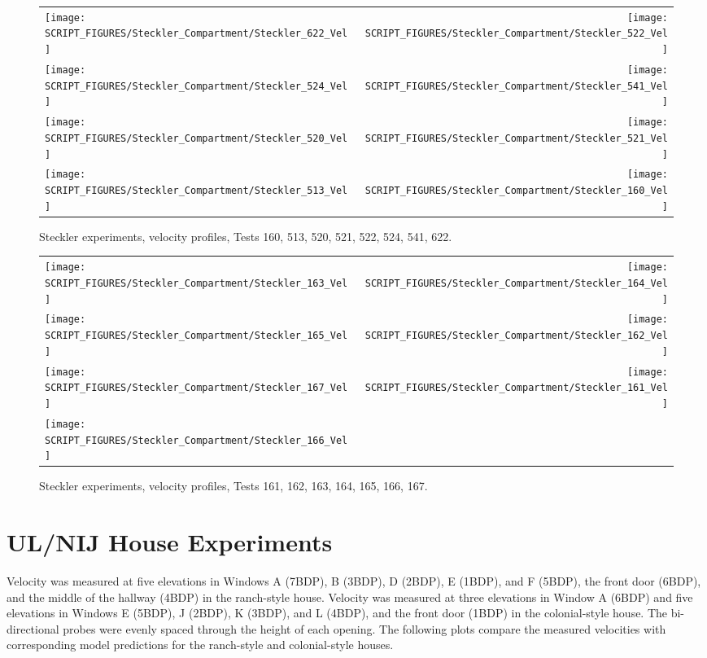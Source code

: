 \begin{figure}[p]
\begin{tabular*}{\textwidth}{l@{\extracolsep{\fill}}r}
\texttt{[image: SCRIPT\_FIGURES/Steckler\_Compartment/Steckler\_622\_Vel]} &
\texttt{[image: SCRIPT\_FIGURES/Steckler\_Compartment/Steckler\_522\_Vel]} \\
\texttt{[image: SCRIPT\_FIGURES/Steckler\_Compartment/Steckler\_524\_Vel]} &
\texttt{[image: SCRIPT\_FIGURES/Steckler\_Compartment/Steckler\_541\_Vel]} \\
\texttt{[image: SCRIPT\_FIGURES/Steckler\_Compartment/Steckler\_520\_Vel]} &
\texttt{[image: SCRIPT\_FIGURES/Steckler\_Compartment/Steckler\_521\_Vel]} \\
\texttt{[image: SCRIPT\_FIGURES/Steckler\_Compartment/Steckler\_513\_Vel]} &
\texttt{[image: SCRIPT\_FIGURES/Steckler\_Compartment/Steckler\_160\_Vel]}
\end{tabular*}
\caption{Steckler experiments, velocity profiles, Tests 160, 513, 520, 521, 522, 524, 541, 622.}
\label{Steckler_Vel_6}
\end{figure}

\begin{figure}[p]
\begin{tabular*}{\textwidth}{l@{\extracolsep{\fill}}r}
\texttt{[image: SCRIPT\_FIGURES/Steckler\_Compartment/Steckler\_163\_Vel]} &
\texttt{[image: SCRIPT\_FIGURES/Steckler\_Compartment/Steckler\_164\_Vel]} \\
\texttt{[image: SCRIPT\_FIGURES/Steckler\_Compartment/Steckler\_165\_Vel]} &
\texttt{[image: SCRIPT\_FIGURES/Steckler\_Compartment/Steckler\_162\_Vel]} \\
\texttt{[image: SCRIPT\_FIGURES/Steckler\_Compartment/Steckler\_167\_Vel]} &
\texttt{[image: SCRIPT\_FIGURES/Steckler\_Compartment/Steckler\_161\_Vel]} \\
\texttt{[image: SCRIPT\_FIGURES/Steckler\_Compartment/Steckler\_166\_Vel]} &
\end{tabular*}
\caption{Steckler experiments, velocity profiles, Tests 161, 162, 163, 164, 165, 166, 167.}
\label{Steckler_Vel_7}
\end{figure}


\clearpage

\section{UL/NIJ House Experiments}

Velocity was measured at five elevations in Windows A (7BDP), B (3BDP), D (2BDP), E (1BDP), and F (5BDP), the front door (6BDP), and the middle of the hallway (4BDP) in the ranch-style house. Velocity was measured at three elevations in Window A (6BDP) and five elevations in Windows E (5BDP), J (2BDP), K (3BDP), and L (4BDP), and the front door (1BDP) in the colonial-style house. The bi-directional probes were evenly spaced through the height of each opening. The following plots compare the measured velocities with corresponding model predictions for the ranch-style and colonial-style houses.


